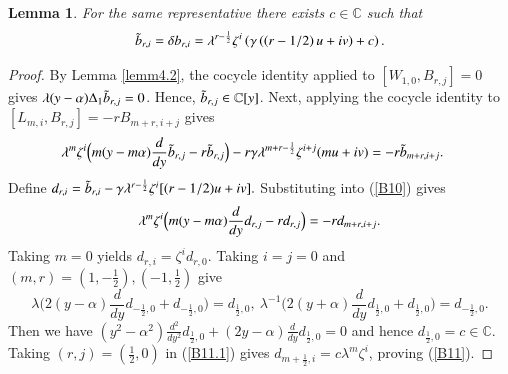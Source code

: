 \documentclass[12pt,reqno]{amsart}
\def\C{\mathbb{C}}
\numberwithin{equation}{section}
\newtheorem{lemm}[theo]{Lemma}
\begin{document}
\begin{lemm}\label{tilde b}
    For the same representative there exists $c\in\C$ such that
    \begin{equation}\label{B11}
\aligned
\Tilde b_{r,i}=\delta b_{r,i}
=\lambda^{r-\frac12}\zeta^i
 \left(
   \gamma\left(\left(r-1/2\right)u+iv\right)+c
 \right).
\endaligned
\end{equation}
\end{lemm}
\begin{proof}
    By Lemma \ref{lemm4.2}, 
the cocycle identity applied to $[W_{1,0},B_{r,j}]=0$ gives $\lambda(y-\alpha)\Delta_1\Tilde{b}_{r,j}=0$. Hence, $\Tilde{b}_{r,j}\in\C[y]$.
Next, applying the cocycle identity to $[L_{m,i},B_{r,j}]=-rB_{m+r,i+j}$ gives
{\begin{equation}\label{B10}
\aligned
&\lambda^m\zeta^i
 \Big(
   m(y-m\alpha)\frac{d}{dy}\Tilde b_{r,j}-r\Tilde b_{r,j}
 \Big)
-r\gamma\lambda^{m+r-\frac12}\zeta^{i+j}(mu+iv)
=-r\Tilde b_{m+r,i+j}.
\endaligned
\end{equation}}
Define $d_{r,i}=\Tilde b_{r,i}-\gamma\lambda^{r-\frac{1}{2}}\zeta^i[(r-1/2)u+iv].$
Substituting into (\ref{B10}) gives
\begin{equation}\label{B11.1}
\aligned
\lambda^m\zeta^i\Big(m(y-m\alpha)\frac{d}{dy}d_{r,j}-rd_{r,j}\Big)=-rd_{m+r,i+j}.
\endaligned
\end{equation}
Taking $m=0$ yields $d_{r,i}=\zeta^id_{r,0}$. Taking $i=j=0$ and $(m,r)=(1,-\frac{1}{2}),(-1,\frac{1}{2})$ give 
\[
    \lambda\Big(2(y-\alpha)\frac{d}{dy}d_{-\frac{1}{2},0}+d_{-\frac{1}{2},0}\Big)=d_{\frac{1}{2},0},\ \lambda^{-1}\Big(2(y+\alpha)\frac{d}{dy}d_{\frac{1}{2},0}+d_{\frac{1}{2},0}\Big)=d_{-\frac{1}{2},0}.
\]
Then we have $(y^2-\alpha^2)\frac{d^2}{dy^2}d_{\frac{1}{2},0}+(2y-\alpha)\frac{d}{dy}d_{\frac{1}{2},0}=0$ and hence $d_{\frac{1}{2},0}=c\in\C$. Taking $(r,j)=(\frac{1}{2},0)$ in (\ref{B11.1}) gives $d_{m+\frac{1}{2},i}=c\lambda^m\zeta^i$, proving (\ref{B11}).
\end{proof}
\end{document}
